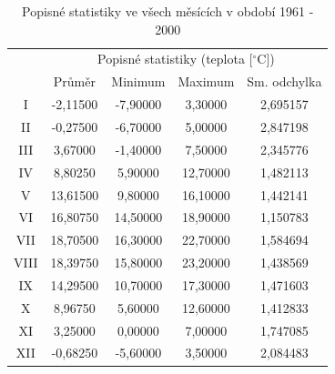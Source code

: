 \documentclass{article}
\begin{document}
 \begin{table}	[h]
 	\caption{Popisné statistiky ve všech měsících v období 1961 - 2000}
 \begin{tabular}{|c|c|c|c|c|}
 	\hline \rule[-2ex]{0pt}{5.5ex}  & \multicolumn{4}{|c|}{Popisné statistiky (teplota [$^\circ$C])}  \\ 
 	       \rule[-2ex]{0pt}{5.5ex} & Průměr&Minimum  &Maximum  &Sm. odchylka  \\ 
 	\hline \rule[-1ex]{0pt}{4.5ex} 	I & -2,11500 & -7,90000& 3,30000&2,695157\\ 
 	\hline \rule[-1ex]{0pt}{4.5ex}  II&-0,27500  & -6,70000 & 5,00000 & 	2,847198 \\ 
 	\hline \rule[-1ex]{0pt}{4.5ex}  III& 	3,67000 & 	-1,40000 & 7,50000 & 2,345776 \\ 
 	\hline \rule[-1ex]{0pt}{4.5ex}  IV& 8,80250 & 5,90000 & 12,70000 & 	1,482113 \\ 
 	\hline \rule[-1ex]{0pt}{4.5ex}  V& 	13,61500 & 9,80000 & 16,10000 & 1,442141 \\ 
 	\hline \rule[-1ex]{0pt}{4.5ex}  VI& 16,80750 & 14,50000 &18,90000  & 1,150783 \\ 
 	\hline \rule[-1ex]{0pt}{4.5ex}  VII& 18,70500 & 	16,30000 & 22,70000 &  	1,584694\\ 
 	\hline \rule[-1ex]{0pt}{4.5ex}  VIII& 	18,39750 &15,80000  & 23,20000 & 	1,438569 \\ 
 	\hline \rule[-1ex]{0pt}{4.5ex}  IX&	14,29500  &10,70000  & 	17,30000 &1,471603  \\ 
 	\hline \rule[-1ex]{0pt}{4.5ex}  X& 8,96750 & 	5,60000 &12,60000 & 1,412833 \\ 
 	\hline \rule[-1ex]{0pt}{4.5ex}  XI&3,25000  & 	0,00000 & 7,00000 & 	1,747085 \\ 
 	\hline \rule[-1ex]{0pt}{4.5ex}  XII&-0,68250  & -5,60000 &3,50000  & 2,084483  \\ 
 	\hline 
 \end{tabular}
\end{table}
 
\end{document}
